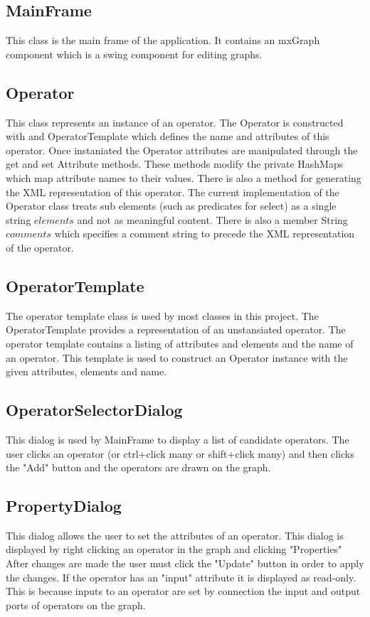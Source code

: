 \documentclass{article}
\begin{document}
\subsection{MainFrame} This class is the main frame of the application.  It contains an mxGraph component which is a swing component for editing graphs.
\subsection{Operator} This class represents an instance of an operator.  The Operator is constructed with and OperatorTemplate which defines the name and attributes of this operator.  Once instaniated the Operator attributes are manipulated through the get and set Attribute methods.  These methods modify the private HashMaps which map attribute names to their values.  There is also a method for generating the XML representation of this operator.  The current implementation of the Operator class treats sub elements (such as predicates for select) as a single string $elements$ and not as meaningful content.  There is also a member String $comments$ which specifies a comment string to precede the XML representation of the operator.
\subsection{OperatorTemplate}  The operator template class is used by most classes in this project.  The OperatorTemplate provides a representation of an unstansiated operator.  The operator template contains a listing of attributes and elements and the name of an operator.  This template is used to construct an Operator instance with the given attributes, elements and name.
\subsection{OperatorSelectorDialog} This dialog is used by MainFrame to display a list of candidate operators.  The user clicks an operator (or ctrl+click many or shift+click many) and then clicks the "Add" button and the operators are drawn on the graph.
\subsection{PropertyDialog} This dialog allows the user to set the attributes of an operator.  This dialog is displayed by right clicking an operator in the graph and clicking "Properties"  After changes are made the user must click the "Update" button in order to apply the changes.  If the operator has an "input" attribute it is displayed as read-only.  This is because inputs to an operator are set by connection the input and output ports of operators on the graph.
\end{document}
